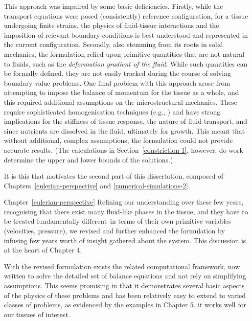 This approach was impaired by some basic deficiencies. Firstly, while
the transport equations were posed (consistently) reference
configuration, for a tissue undergoing finite strains, the physics of
fluid-tissue interactions and the imposition of relevant boundary
conditions is best understood and represented in the current
configuration.
Secondly, also stemming from its 
roots in solid mechanics, the formulation relied upon primitive
quantities that are not natural to fluids, such as the {\em
  deformation gradient of the fluid}. While such quantities can be
formally defined, they are not easily tracked during the course of
solving boundary value problems. One final problem with this approach
arose from attempting to impose the balance of momentum for the tissue
as a whole, and this required additional assumptions on the
microstructural mechanics. These require sophisticated homogenisation
techniques (e.g., \citet{IdiartCastaneda:2003}) and have strong implications
for the stiffness of tissue response, the nature of fluid transport,
and since nutrients are dissolved in the fluid, ultimately for
growth. This meant that without additional, complex assumptions, the
formulation could not provide accurate results. (The calculations in
Section~\ref{constriction-1}, however, do work determine the upper and
lower bounds of the solutions.)

It is this that motivates the second part of this dissertation,
composed of Chapters~\ref{eulerian-perspective} and
\ref{numerical-simulations-2}.



Chapter~\ref{eulerian-perspective} Refining our understanding over these few years, recognising that
there exist many fluid-like phases in the tissue, and they have to be
treated fundamentally different--in terms of their own primitive
variables (velocities, pressure), we revised and further enhanced the
formulation by infusing few years worth of insight gathered about the
system. This discussion is at the heart of Chapter 4.

 With the revised formulation exists the related computational
framework, now written to solve the detailed set of balance equations
and not rely on simplifying assumptions. This seems promising in that
it demonstrates several basic aspects of the physics of these problems
and has been relatively easy to extend to varied classes of problems,
as evidenced by the examples in Chapter 5. it works well for our
tissues of interest.

